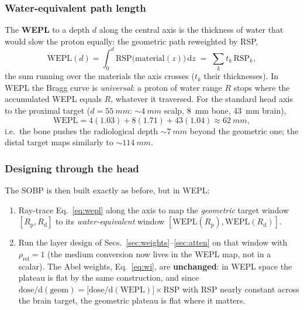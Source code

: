 \documentclass[11pt]{article}
\newcommand{\Rd}{R_{\mathrm d}}
\newcommand{\Rp}{R_{\mathrm p}}
\begin{document}
\subsubsection{Water-equivalent path length}
The \textbf{WEPL} to a depth $d$ along the central axis is the thickness of water
that would slow the proton equally: the geometric path reweighted by RSP,
\begin{equation}
\mathrm{WEPL}(d)=\int_0^{d}\mathrm{RSP}\big(\mathrm{material}(z)\big)\,\mathrm dz
\;=\;\sum_k t_k\,\mathrm{RSP}_k ,
\label{eq:wepl}
\end{equation}
the sum running over the materials the axis crosses ($t_k$ their thicknesses). In
WEPL the Bragg curve is \emph{universal}: a proton of water range $R$ stops where
the accumulated WEPL equals $R$, whatever it traversed. For the standard head axis
to the proximal target ($d=\SI{55}{mm}$: ${\sim}\SI{4}{mm}$ scalp, \SI{8}{mm}
bone, \SI{43}{mm} brain),
\[
\mathrm{WEPL}=4(1.03)+8(1.71)+43(1.04)\approx\SI{62}{mm},
\]
i.e.\ the bone pushes the radiological depth ${\sim}\SI{7}{mm}$ beyond the
geometric one; the distal target maps similarly to ${\sim}\SI{114}{mm}$.

\subsubsection{Designing through the head}
The SOBP is then built exactly as before, but in WEPL:
\begin{enumerate}[nosep]
\item Ray-trace Eq.~\eqref{eq:wepl} along the axis 
to map the \emph{geometric} target
window $[\Rp,\Rd]$ to its \emph{water-equivalent} window
$[\mathrm{WEPL}(\Rp),\mathrm{WEPL}(\Rd)]$.
\item Run the layer design of Secs.~\ref{sec:weights}--\ref{sec:atten} on that
window with $\rho_{\mathrm{rel}}=1$ (the medium conversion now lives in the WEPL
map, not in a scalar). The Abel weights, Eq.~\eqref{eq:wi}, are \textbf{unchanged}:
in WEPL space the plateau is flat by the same construction, and since
$\mathrm{dose}/\mathrm d(\text{geom})=\big[\mathrm{dose}/\mathrm d(\mathrm{WEPL})\big]
\times\mathrm{RSP}$ with RSP nearly constant across the brain target, the geometric
plateau is flat where it matters.
\end{enumerate}
\end{document}
